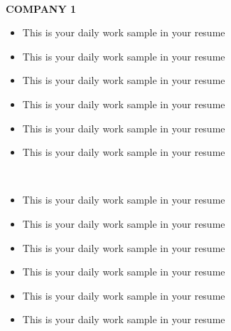 \documentclass{ctexart}
\theoremstyle{plain}
\begin{document}
\begin{paracol}{2}
	\hspace*{.05\linewidth}{\rule[4pt]{18cm}{0.5pt}}%
	
	
	
		
	\\
	\hspace*{.05\linewidth}
	{
	\MakeUppercase{\small\textbf{Company 1}}
	}
	
	\begin{itemize}
		\item{\normalsize{This is your daily work sample in your resume}}
		\item{\normalsize{This is your daily work sample in your resume}}
		\item{\normalsize{This is your daily work sample in your resume}}
		\item{\normalsize{This is your daily work sample in your resume}}
		\item{\normalsize{This is your daily work sample in your resume}}
		\item{\normalsize{This is your daily work sample in your resume}}
	\end{itemize}
	
		
	\\
	\begin{itemize}
		\item{\normalsize{This is your daily work sample in your resume}}
		\item{\normalsize{This is your daily work sample in your resume}}
		\item{\normalsize{This is your daily work sample in your resume}}
		\item{\normalsize{This is your daily work sample in your resume}}
		\item{\normalsize{This is your daily work sample in your resume}}
		\item{\normalsize{This is your daily work sample in your resume}}
	\end{itemize}
	
	\\


\end{paracol}
\end{document}
